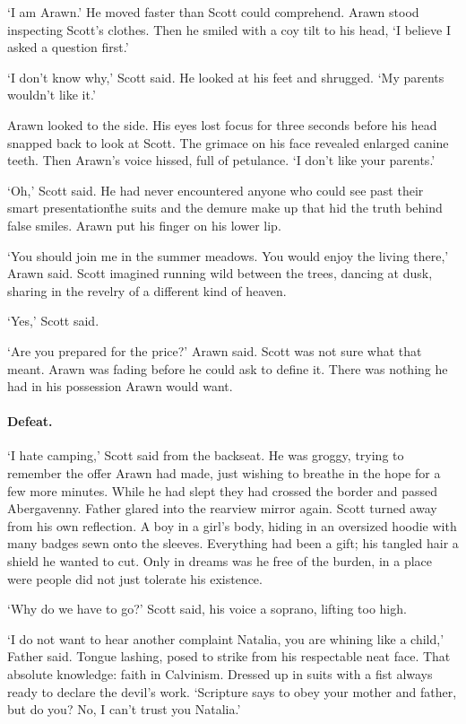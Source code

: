 `I am Arawn.' He moved faster than Scott could comprehend. Arawn
stood inspecting Scott's clothes. Then he smiled with a coy tilt to
his head, `I believe I asked a question first.'

`I don't know why,' Scott said. He looked at his feet and
shrugged. `My parents wouldn't like it.'

Arawn looked to the side. His eyes lost focus for three seconds before
his head snapped back to look at Scott. The grimace on his face
revealed enlarged canine teeth. Then Arawn's voice hissed, full of
petulance. `I don't like your parents.'

`Oh,' Scott said. He had never encountered anyone who could see past
their smart presentation\=the suits and the demure make up that hid
the truth behind false smiles. Arawn put his finger on his lower lip.

`You should join me in the summer meadows. You would enjoy the living
there,' Arawn said. Scott imagined running wild between the trees,
dancing at dusk, sharing in the revelry of a different kind of heaven.

`Yes,' Scott said.

`Are you prepared for the price?' Arawn said. Scott was not sure what
that meant. Arawn was fading before he could ask to define it. There
was nothing he had in his possession Arawn would want.

\paragraph{Defeat.}

`I hate camping,' Scott said from the backseat. He was groggy,
trying to remember the offer Arawn had made, just wishing to breathe in the
hope for a few more minutes. While he had slept they had crossed the
border and passed Abergavenny. Father glared into the rearview mirror
again. Scott turned away from his own reflection. A boy in a girl's
body, hiding in an oversized hoodie with many badges sewn onto the
sleeves. Everything had been a gift; his tangled hair a shield he
wanted to cut. Only in dreams was he free of the burden, in a place
were people did not just tolerate his existence.

`Why do we have to go?' Scott said, his voice a soprano, lifting too high.

`I do not want to hear another complaint Natalia, you are whining
like a child,' Father said. Tongue lashing, posed to strike from his
respectable neat face. That absolute knowledge: faith in
Calvinism. Dressed up in suits with a fist always ready to declare the
devil's work. `Scripture says to obey your mother and father, but do
you? No, I can't trust you Natalia.'

